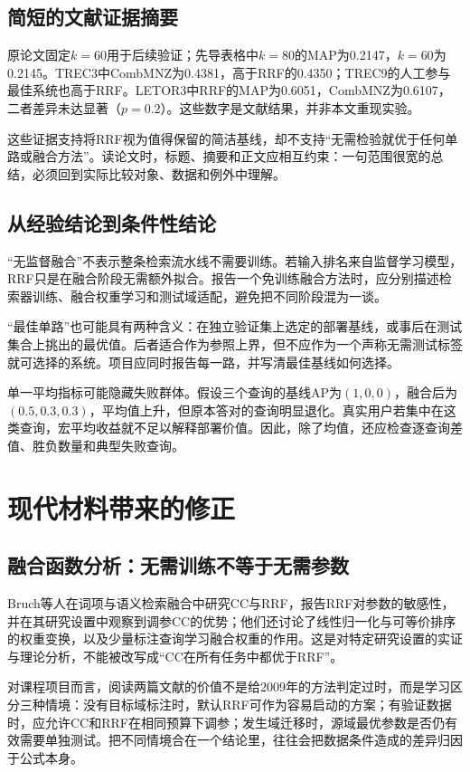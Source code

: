 \documentclass[sigconf,nonacm]{acmart}
\begin{document}
\subsection{简短的文献证据摘要}
原论文固定$k=60$用于后续验证；先导表格中$k=80$的MAP为0.2147，$k=60$为0.2145。TREC3中CombMNZ为0.4381，高于RRF的0.4350；TREC9的人工参与最佳系统也高于RRF。LETOR3中RRF的MAP为0.6051，CombMNZ为0.6107，二者差异未达显著（$p=0.2$）\cite{cormack2009rrf}。这些数字是文献结果，并非本文重现实验。

这些证据支持将RRF视为值得保留的简洁基线，却不支持“无需检验就优于任何单路或融合方法”。读论文时，标题、摘要和正文应相互约束：一句范围很宽的总结，必须回到实际比较对象、数据和例外中理解。

\subsection{从经验结论到条件性结论}
“无监督融合”不表示整条检索流水线不需要训练。若输入排名来自监督学习模型，RRF只是在融合阶段无需额外拟合。报告一个免训练融合方法时，应分别描述检索器训练、融合权重学习和测试域适配，避免把不同阶段混为一谈。

“最佳单路”也可能具有两种含义：在独立验证集上选定的部署基线，或事后在测试集合上挑出的最优值。后者适合作为参照上界，但不应作为一个声称无需测试标签就可选择的系统。项目应同时报告每一路，并写清最佳基线如何选择。

单一平均指标可能隐藏失败群体。假设三个查询的基线AP为$(1,0,0)$，融合后为$(0.5,0.3,0.3)$，平均值上升，但原本答对的查询明显退化。真实用户若集中在这类查询，宏平均收益就不足以解释部署价值。因此，除了均值，还应检查逐查询差值、胜负数量和典型失败查询。

\section{现代材料带来的修正}
\subsection{融合函数分析：无需训练不等于无需参数}
Bruch等人在词项与语义检索融合中研究CC与RRF，报告RRF对参数的敏感性，并在其研究设置中观察到调参CC的优势；他们还讨论了线性归一化与可等价排序的权重变换，以及少量标注查询学习融合权重的作用\cite{bruch2023analysis}。这是对特定研究设置的实证与理论分析，不能被改写成“CC在所有任务中都优于RRF”。

对课程项目而言，阅读两篇文献的价值不是给2009年的方法判定过时，而是学习区分三种情境：没有目标域标注时，默认RRF可作为容易启动的方案；有验证数据时，应允许CC和RRF在相同预算下调参；发生域迁移时，源域最优参数是否仍有效需要单独测试。把不同情境合在一个结论里，往往会把数据条件造成的差异归因于公式本身。
\end{document}
